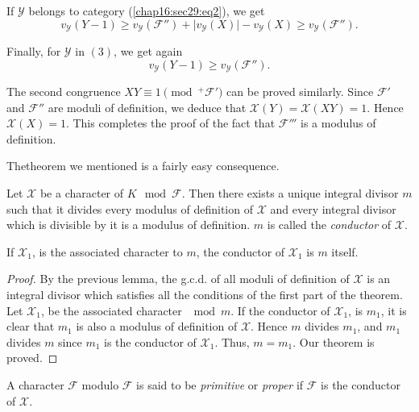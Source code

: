 If $\mathscr{Y}$ belongs to category (\ref{chap16:sec29:eq2}), we get
$$
v_\mathscr{Y} (Y - 1) \geq v_\mathscr{Y} (\mathcal{F}'') + \big |
v_\mathscr{Y} (X) \big | - v_\mathscr{Y} (X) \ge v_\mathscr{Y}
(\mathcal{F}''). 
$$

Finally, for $\mathscr{Y}$ in $(3)$, we get again
$$
v_\mathscr{Y} (Y - 1) \ge v_\mathscr{Y} (\mathcal{F}'').
$$

The second congruence $XY \equiv 1 \pmod {^+ \mathcal{F}'}$ can be
proved similarly. Since $\mathcal{F}'$ and $\mathcal{F}''$ are moduli
of definition, we deduce that $\mathcal{X}(Y) = \mathcal{X} (XY) =
1$. Hence $\mathcal{X} (X) = 1$. This completes the proof of the fact
that $\mathcal{F}'''$ is a modulus of definition. 

The\pageoriginale theorem we mentioned is a fairly easy consequence. 

\begin{theorem*}%
  Let $\mathcal{X}$ be a character of $K \mod \mathcal{F}$. Then there
  exists a unique integral divisor $m$ such that it divides every
  modulus of definition of $\mathscr{X}$ and every integral divisor
  which is divisible by it is a modulus of definition. $m$ is called
  the \textit{conductor } of $\mathcal{X}$.  
\end{theorem*}

If $\mathcal{X}_1$, is the associated character to $m$, the conductor of
$\mathcal{X}_1$ is $m$ itself. 

\begin{proof}
  By the previous lemma, the g.c.d. of all moduli of definition of
  $\mathcal{X}$ is an integral divisor which satisfies all the
  conditions of the first part of the theorem. Let $\mathcal{X}_1$, be
  the associated character $\mod m$. If the conductor of
  $\mathcal{X}_1$, is $m_1$, it is clear that $m_1$ is also a  modulus
  of definition of $\mathcal{X}$. Hence $m$ divides $m_1$, and $m_1$
  divides $m$ since $m_1$ is the conductor of $\mathcal{X}_1$. Thus,
  $m = m_1$. Our theorem is proved. 
\end{proof}

A character $\mathcal{F}$ modulo $\mathcal{F}$ is said to be \textit{
  primitive } or \textit{ proper } if $\mathcal{F}$ is the conductor
of $\mathcal{X}$. 
